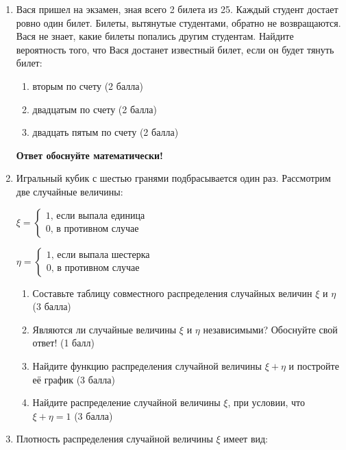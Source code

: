 \begin{enumerate}

    \item Вася пришел на экзамен, зная всего 2 билета из 25. Каждый студент достает ровно один билет. Билеты, вытянутые студентами, обратно не возвращаются. Вася не знает, какие билеты попались другим студентам. Найдите вероятность того, что Вася достанет известный билет, если он будет тянуть билет:

    \begin{enumerate}
		\item вторым по счету (2 балла)
        \item двадцатым по счету (2 балла)
        \item двадцать пятым по счету (2 балла)
     \end{enumerate}

     \textbf{Ответ обоснуйте математически!}

    \item Игральный кубик с шестью гранями подбрасывается один раз. Рассмотрим две случайные величины:
    \begin{center}
    $\xi=\begin{cases}1\text{, если выпала единица}\\0\text{, в противном случае}\end{cases}$

    $\eta=\begin{cases}1\text{, если выпала шестерка}\\0\text{, в противном случае}\end{cases}$

    \begin{enumerate}
		\item Составьте таблицу совместного распределения случайных величин $\xi$ и $\eta$ (3 балла)
		\item Являются ли случайные величины $\xi$ и $\eta$ независимыми? Обоснуйте свой ответ! (1 балл)
		\item Найдите функцию распределения случайной величины $\xi+\eta$ и постройте её график (3 балла)
		\item Найдите распределение случайной величины $\xi$, при условии, что $\xi+\eta=1$ (3 балла)
     \end{enumerate}
     \end{center}
    \item Плотность распределения случайной величины $\xi$ имеет вид:


\end{enumerate}
